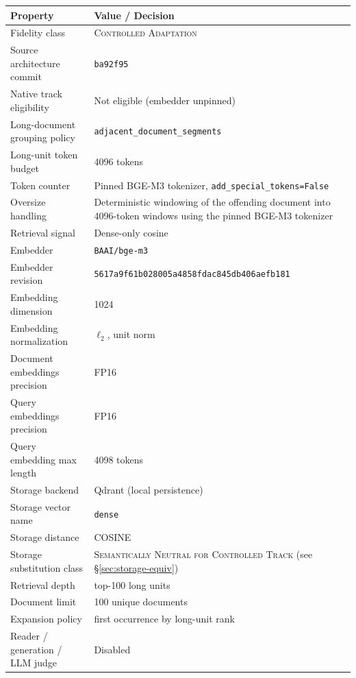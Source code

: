 \documentclass[11pt,a4paper]{article}
\begin{document}
\begin{center}
\begin{tabular}{p{4.5cm} p{10cm}}
\toprule
\textbf{Property} & \textbf{Value / Decision} \\
\midrule
Fidelity class & \textsc{Controlled Adaptation} \\
Source architecture commit & \texttt{ba92f95} \\
Native track eligibility & Not eligible (embedder unpinned) \\
Long-document grouping policy & \texttt{adjacent\_document\_segments} \\
Long-unit token budget & \SI{4096}{} tokens \\
Token counter & Pinned BGE-M3 tokenizer,
  \texttt{add\_special\_tokens=False} \\
Oversize handling & Deterministic windowing of the offending
  document into \SI{4096}{}-token windows using the pinned
  BGE-M3 tokenizer \\
Retrieval signal & Dense-only cosine \\
Embedder & \texttt{BAAI/bge-m3} \\
Embedder revision & \texttt{5617a9f61b028005a4858fdac845db406aefb181} \\
Embedding dimension & 1024 \\
Embedding normalization & $\ell_2$, unit norm \\
Document embeddings precision & FP16 \\
Query embeddings precision & FP16 \\
Query embedding max length & \SI{4098}{} tokens \\
Storage backend & Qdrant (local persistence) \\
Storage vector name & \texttt{dense} \\
Storage distance & COSINE \\
Storage substitution class &
  \textsc{Semantically Neutral for Controlled Track}
  (see \S\ref{sec:storage-equiv}) \\
Retrieval depth & top-\num{100} long units \\
Document limit & \num{100} unique documents \\
Expansion policy & first occurrence by long-unit rank \\
Reader / generation / LLM judge & Disabled \\
\bottomrule
\end{tabular}
\end{center}
\end{document}
